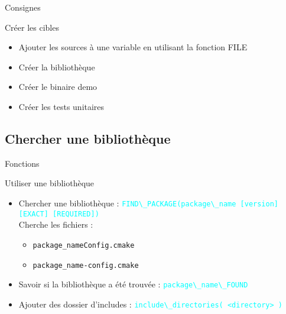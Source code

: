 \documentclass{beamer}
\begin{document}
\begin{frame}{Consignes}
  \begin{exampleblock}{Créer les cibles}
    \begin{itemize}
    \item Ajouter les sources à une variable en utilisant la fonction FILE
    \item Créer la bibliothèque
    \item Créer le binaire \og demo \fg
    \item Créer les tests unitaires
    \end{itemize}
  \end{exampleblock}
\end{frame}

\subsection{Chercher une bibliothèque}
\begin{frame}[fragile]{Fonctions}
  \begin{block}{Utiliser une bibliothèque}
    \begin{itemize}
    \item Chercher une bibliothèque :\linebreak
      \textcolor{cyan}{\verb?FIND\_PACKAGE(package\_name [version] [EXACT] [REQUIRED])?}\\
      Cherche les fichiers :\\
      \begin{itemize}
      \item \verb?package_nameConfig.cmake ?
      \item \verb?package_name-config.cmake ?
      \end{itemize}
    \item Savoir si la bibliothèque a été trouvée :\linebreak
      \textcolor{cyan}{\verb?package\_name\_FOUND?}
    \item Ajouter des dossier d'includes :\linebreak
      \textcolor{cyan}{\verb?include\_directories( <directory> )?}
    \end{itemize}
  \end{block}
\end{frame}
\end{document}
